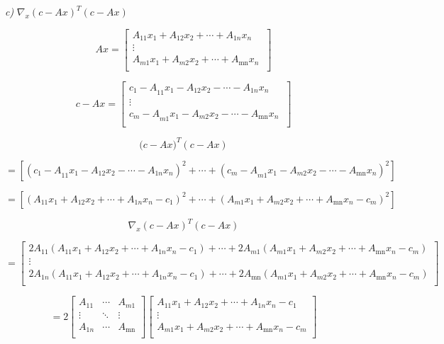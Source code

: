 \documentclass[
]{article}
\begin{document}
\emph{c)} \(\nabla_{x}\left( c - Ax \right)^{T}\left( c - Ax \right)\)

\[Ax = \left\lbrack \begin{matrix}
A_{11}x_{1} + A_{12}x_{2} + \cdots + A_{1n}x_{n} \\
 \vdots \\
A_{m1}x_{1} + A_{m2}x_{2} + \cdots + A_{\text{mn}}x_{n} \\
\end{matrix}\  \right\rbrack\]

\[c - Ax = \left\lbrack \begin{matrix}
{c_{1} - A}_{11}x_{1} - A_{12}x_{2} - \cdots - A_{1n}x_{n} \\
 \vdots \\
{c_{m} - A}_{m1}x_{1} - A_{m2}x_{2} - \cdots - A_{\text{mn}}x_{n} \\
\end{matrix}\  \right\rbrack\]



\[({c - Ax)}^{T}(c - Ax)\]

\[= \left\lbrack {({c_{1} - A}_{11}x_{1} - A_{12}x_{2} - \cdots - A_{1n}x_{n})}^{2} + \cdots + {({c_{m} - A}_{m1}x_{1} - A_{m2}x_{2} - \cdots - A_{\text{mn}}x_{n})}^{2} \right\rbrack\]

\[= \left\lbrack {(A_{11}x_{1} + A_{12}x_{2} + \cdots + A_{1n}x_{n} - c_{1})}^{2} + \cdots + {(A_{m1}x_{1} + A_{m2}x_{2} + \cdots + A_{\text{mn}}x_{n} - c_{m})}^{2} \right\rbrack\]

\[\nabla_{x}\left( c - Ax \right)^{T}\left( c - Ax \right)\]

\[= \begin{bmatrix}
2A_{11}(A_{11}x_{1} + A_{12}x_{2} + \cdots + A_{1n}x_{n} - c_{1}) + \cdots + 2A_{m1}(A_{m1}x_{1} + A_{m2}x_{2} + \cdots + A_{\text{mn}}x_{n} - c_{m}) \\
 \vdots \\
2A_{1n}(A_{11}x_{1} + A_{12}x_{2} + \cdots + A_{1n}x_{n} - c_{1}) + \cdots + 2A_{\text{mn}}(A_{m1}x_{1} + A_{m2}x_{2} + \cdots + A_{\text{mn}}x_{n} - c_{m}) \\
\end{bmatrix}\]

\[= 2\begin{bmatrix}
A_{11} & \cdots & A_{m1} \\
 \vdots & \ddots & \vdots \\
A_{1n} & \cdots & A_{\text{mn}} \\
\end{bmatrix}\begin{bmatrix}
A_{11}x_{1} + A_{12}x_{2} + \cdots + A_{1n}x_{n} - c_{1} \\
 \vdots \\
A_{m1}x_{1} + A_{m2}x_{2} + \cdots + A_{\text{mn}}x_{n} - c_{m} \\
\end{bmatrix}\]\\
\end{document}
